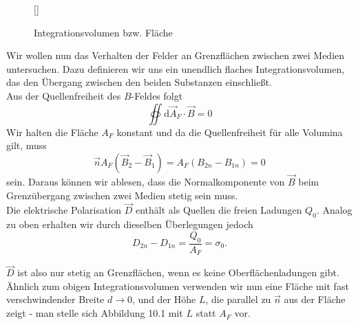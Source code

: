 \begin{wrapfigure}[]{r}[0cm]{0cm}
	\raisebox{0pt}[\dimexpr{}\baselineskip\relax]{
		\colorbox{hgrey}{
		}
	}
	\caption{Integrationsvolumen  bzw. Fläche}
\end{wrapfigure}
Wir wollen nun das Verhalten der Felder an Grenzflächen zwischen zwei Medien untersuchen. Dazu definieren wir uns ein unendlich flaches Integrationsvolumen, das den Übergang zwischen den beiden Substanzen einschließt.\\
Aus der Quellenfreiheit des $B$-Feldes folgt
\begin{equation*}
\oiint\mathrm{d}\vec{A}_F\cdot\vec{B}=0
\end{equation*}
Wir halten die Fläche $A_F$ konstant und da die Quellenfreiheit für alle Volumina gilt, muss 
\begin{equation*}
\vec{n}A_F(\vec{B}_2-\vec{B}_1) = A_F(B_{2n}-B_{1n}) = 0
\end{equation*}
sein. Daraus können wir ablesen, dass die Normalkomponente von $\vec{B}$ beim Grenzübergang zwischen zwei Medien stetig sein muss.\\

Die elektrische Polarisation $\vec{D}$ enthält als Quellen die freien Ladungen $Q_0$. Analog zu oben erhalten wir durch dieselben Überlegungen jedoch
\begin{equation*}
D_{2n}-D_{1n}=\frac{Q_0}{A_F}=\sigma_0.
\end{equation*}

$\vec{D}$ ist also nur stetig an Grenzflächen, wenn es keine Oberflächenladungen gibt.\\

Ähnlich zum obigen Integrationsvolumen verwenden wir nun eine Fläche mit fast verschwindender Breite $d\rightarrow 0$, und der Höhe $L$, die parallel zu $\vec{n}$ aus der Fläche zeigt - man stelle sich Abbildung 10.1 mit $L$ statt $A_F$ vor.\\

